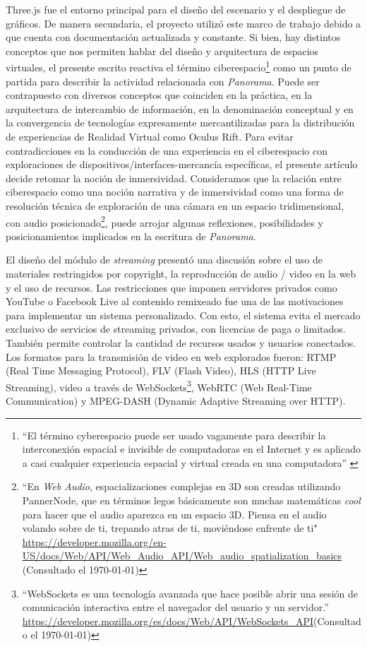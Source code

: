 Three.js fue el entorno principal para el diseño del escenario y el despliegue de gráficos. De manera secundaria, el proyecto utilizó este marco de trabajo debido a que cuenta con documentación actualizada y constante. Si bien, hay distintos conceptos que nos permiten hablar del diseño y arquitectura de espacios virtuales, el presente escrito reactiva el término ciberespacio\footnote{``El término cyberespacio puede ser usado vagamente para describir la interconexión espacial e invisible de computadoras en el Internet y es aplicado a casi cualquier experiencia espacial y virtual creada en una computadora'' \citep{cyberspace}} como un punto de partida para describir la actividad relacionada con \textit{Panorama}. Puede ser contrapuesto con diversos conceptos que coinciden en la práctica, en la arquitectura de intercambio de información, en la denominación conceptual y en la convergencia de tecnologías expresamente mercantilizadas para la distribución de experiencias de Realidad Virtual como Oculus Rift. Para evitar contradicciones en la conducción de una experiencia en el ciberespacio con exploraciones de dispositivos/interfaces-mercancía específicas, el presente artículo decide retomar la noción de inmersividad. Consideramos que la relación entre ciberespacio como una noción narrativa y de inmersividad como una forma de resolución técnica de exploración de una cámara en un espacio tridimensional, con audio posicionado\footnote{``En \textit{Web Audio}, espacializaciones complejas en 3D son creadas utilizando PannerNode, que en términos legos básicamente son muchas matemáticas \textit{cool} para hacer que el audio aparezca en un espacio 3D. Piensa en el audio volando sobre de ti, trepando atras de ti, moviéndose enfrente de ti" \url{https://developer.mozilla.org/en-US/docs/Web/API/Web_Audio_API/Web_audio_spatialization_basics} (Consultado el \today)}, puede arrojar algunas reflexiones, posibilidades y posicionamientos implicados en la escritura de \textit{Panorama}. %
\color{black}

El diseño del módulo de \textit{streaming} presentó una discusión sobre el uso de materiales restringidos por copyright, la reproducción de audio / video en la web y el uso de recursos. Las restricciones que imponen servidores privados como YouTube o Facebook Live al contenido remixeado fue una de las motivaciones para implementar un sistema personalizado. Con esto, el sistema evita el mercado exclusivo de servicios de streaming privados, con licencias de paga o limitados. También permite controlar la cantidad de recursos usados y usuarios conectados. Los formatos para la transmisión de video en web explorados fueron: RTMP (Real Time Messaging Protocol), FLV (Flash Video), HLS (HTTP Live Streaming), video a través de WebSockets\footnote{``WebSockets es una tecnología avanzada que hace posible abrir una sesión de comunicación interactiva entre el navegador del usuario y un servidor.'' \url{https://developer.mozilla.org/es/docs/Web/API/WebSockets_API}(Consultado el \today)}, WebRTC (Web Real-Time Communication) y MPEG-DASH (Dynamic Adaptive Streaming over HTTP).

